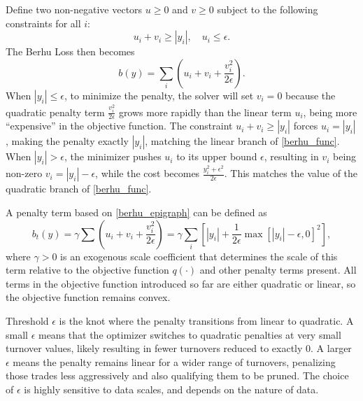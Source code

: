 \documentclass[11pt, letterpaper]{article}
\begin{document}
Define two non-negative vectors $u \geq 0$ and $v \geq 0$ subject to the following constraints for all $i$:
\begin{equation*}
	u_i + v_i \geq |y_i|, \quad u_i \leq \epsilon.
\end{equation*}
The Berhu Loss then becomes
\begin{equation}
  \label{berhu_epigraph}
	b(y) = \sum_i \left(u_i + v_i + \frac{v_i^2}{2\epsilon}\right).
\end{equation}
When $|y_i| \leq \epsilon$, to minimize the penalty, the solver will set $v_i = 0$ because the quadratic penalty term
$\frac{v_i^2}{2\epsilon}$ grows more rapidly than the linear term $u_i$, being more ``expensive'' in the objective function. The
constraint $u_i + v_i \geq |y_i|$ forces $u_i = |y_i|$, making the penalty exactly $|y_i|$, matching the linear branch of
\eqref{berhu_func}. When $|y_i| > \epsilon$, the minimizer pushes $u_i$ to its upper bound $\epsilon$, resulting in $v_i$ being
non-zero $v_i = |y_i| - \epsilon$, while the cost becomes $\frac{y_i^2 + \epsilon ^ 2}{2\epsilon}$. This matches the value of
the quadratic branch of \eqref{berhu_func}.

A penalty term based on \eqref{berhu_epigraph} can be defined as
\begin{equation}
  \label{eq:berhu_loss}
	b_t(y) = \gamma \sum \left(u_i + v_i + \frac{v_i^2}{2\epsilon}\right) = \gamma \sum_i{\left[|y_i| + \frac{1}{2\epsilon}\max[|y_i| - \epsilon, 0]^2\right]},
\end{equation}
where $\gamma > 0$ is an exogenous scale coefficient that determines the scale of this term relative to the objective function
$q(\cdot)$ and other penalty terms present. All terms in the objective function introduced so far are either quadratic or
linear, so the objective function remains convex.

Threshold $\epsilon$ is the knot where the penalty transitions from linear to quadratic. A small $\epsilon$ means that the
optimizer switches to quadratic penalties at very small turnover values, likely resulting in fewer turnovers reduced to exactly
$0$. A larger $\epsilon$ means the penalty remains linear for a wider range of turnovers, penalizing those trades less
aggressively and also qualifying them to be pruned. The choice of $\epsilon$ is highly sensitive to data scales, and depends on
the nature of data.
\end{document}
